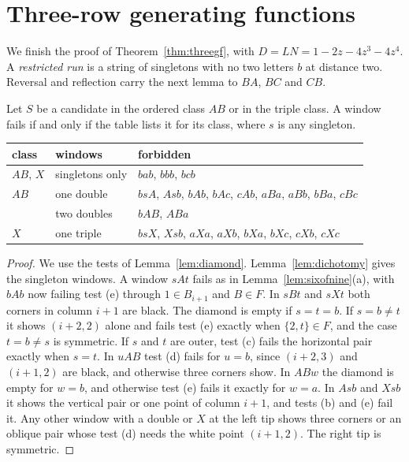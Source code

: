 \section{Three-row generating functions}\label{app:threegf}

We finish the proof of Theorem~\ref{thm:threegf}, with $D=LN=1-2z-4z^3-4z^4$. A
\emph{restricted run} is a string of singletons with no two letters $b$ at distance two.
Reversal and reflection carry the next lemma to $BA$, $BC$ and $CB$.

\begin{lemma}\label{lem:threewindows}
Let $S$ be a candidate in the ordered class $AB$ or in the triple class. A window fails if
and only if the table lists it for its class, where $s$ is any singleton.
\begin{center}\small
\begin{tabular}{@{}lll@{}}
\toprule
class & windows & forbidden \\
\midrule
$AB$, $X$ & singletons only & $bab$, $bbb$, $bcb$ \\
$AB$ & one double & $bsA$, $Asb$, $bAb$, $bAc$, $cAb$, $aBa$, $aBb$, $bBa$, $cBc$ \\
 & two doubles & $bAB$, $ABa$ \\
$X$ & one triple & $bsX$, $Xsb$, $aXa$, $aXb$, $bXa$, $bXc$, $cXb$, $cXc$ \\
\bottomrule
\end{tabular}
\end{center}
\end{lemma}

\begin{proof}
We use the tests of Lemma~\ref{lem:diamond}. Lemma~\ref{lem:dichotomy} gives the singleton
windows. A window $sAt$ fails as in Lemma~\ref{lem:sixofnine}(a), with $bAb$ now failing test
(e) through $1\in B_{i+1}$ and $B\in F$. In $sBt$ and $sXt$ both corners in column $i+1$ are
black. The diamond is empty if $s=t=b$. If $s=b\ne t$ it shows $(i+2,2)$ alone and fails test (e)
exactly when $\{2,t\}\in F$, and the case $t=b\ne s$ is symmetric. If $s$ and $t$ are outer, test
(c) fails the horizontal pair exactly when $s=t$. In $uAB$ test (d) fails for $u=b$, since
$(i+2,3)$ and $(i+1,2)$ are black, and otherwise three corners show. In $ABw$ the diamond is empty
for $w=b$, and otherwise test (e) fails it exactly for $w=a$. In $Asb$ and $Xsb$ it shows the
vertical pair or one point of column $i+1$, and tests (b) and (e) fail it. Any other window with
a double or $X$ at the left tip shows three corners or an oblique pair whose test (d) needs the
white point $(i+1,2)$. The right tip is symmetric.
\end{proof}

